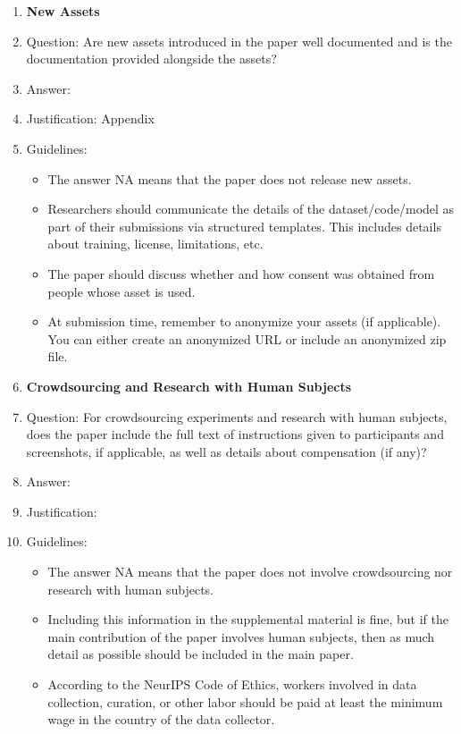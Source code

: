 \documentclass{article}
\begin{document}
\begin{enumerate}
\item {\bf New Assets}
    \item[] Question: Are new assets introduced in the paper well documented and is the documentation provided alongside the assets?
    \item[] Answer: \answerYes{} %
    \item[] Justification: Appendix
    \item[] Guidelines:
    \begin{itemize}
        \item The answer NA means that the paper does not release new assets.
        \item Researchers should communicate the details of the dataset/code/model as part of their submissions via structured templates. This includes details about training, license, limitations, etc. 
        \item The paper should discuss whether and how consent was obtained from people whose asset is used.
        \item At submission time, remember to anonymize your assets (if applicable). You can either create an anonymized URL or include an anonymized zip file.
    \end{itemize}

\item {\bf Crowdsourcing and Research with Human Subjects}
    \item[] Question: For crowdsourcing experiments and research with human subjects, does the paper include the full text of instructions given to participants and screenshots, if applicable, as well as details about compensation (if any)? 
    \item[] Answer: \answerNA{} %
    \item[] Justification: 
    \item[] Guidelines:
    \begin{itemize}
        \item The answer NA means that the paper does not involve crowdsourcing nor research with human subjects.
        \item Including this information in the supplemental material is fine, but if the main contribution of the paper involves human subjects, then as much detail as possible should be included in the main paper. 
        \item According to the NeurIPS Code of Ethics, workers involved in data collection, curation, or other labor should be paid at least the minimum wage in the country of the data collector. 
    \end{itemize}


\end{enumerate}
\end{document}
